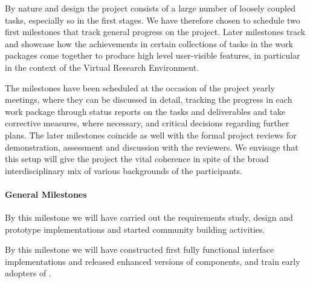 

By nature and design the project consists of a large number of loosely
coupled tasks, especially so in the first stages. We have therefore
chosen to schedule two first milestones that track general progress on
the project. Later milestones track and showcase how the achievements
in certain collections of tasks in the work packages come together to
produce high level user-visible features, in particular in the context
of the Virtual Research Environment.

The milestones have been scheduled at the occasion of the project
yearly meetings, where they can be discussed in detail, tracking the
progress in each work package through status reports on the tasks and
deliverables and take corrective measures, where necessary, and
critical decisions regarding further plans. The later milestones
coincide as well with the formal project reviews for demonstration,
assessment and discussion with the reviewers.
%
We envisage that this
setup will give the project the vital coherence in spite of the broad
interdisciplinary mix of various backgrounds of the participants.

\paragraph{General Milestones}

\begin{milestones}
  {By this milestone we will have carried out the requirements study, design and prototype implementations and started community building activities.}

  {By this milestone we will have constructed first fully functional interface implementations and released enhanced versions of \TheProject components, and train early adopters of \TheProject.}

\end{milestones}

